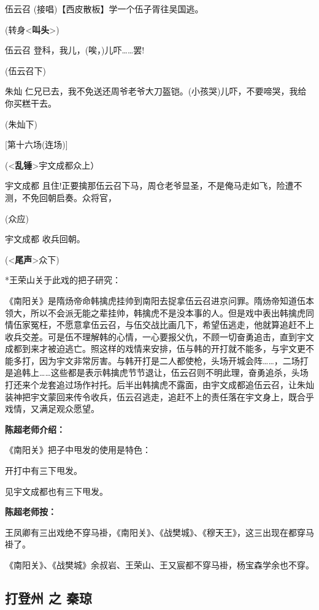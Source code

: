 伍云召 (接唱)【西皮散板】学一个伍子胥往吴国逃。

(转身\textless{}\textbf{叫头}\textgreater{})

伍云召 登科，我儿，(唉，)儿吓\ldots{}\ldots{}罢!

(伍云召下)

朱灿
仁兄已去，我不免送还周爷老爷大刀盔铠。(小孩哭)儿吓，不要啼哭，我给你买糕干去。

(朱灿下)

{[}第十六场(连场){]}

(\textless{}\textbf{乱锤}\textgreater{}宇文成都众上）

宇文成都
且住!正要擒那伍云召下马，周仓老爷显圣，不是俺马走如飞，险遭不测，不免回朝启奏。众将官，

(众应)

宇文成都 收兵回朝。

(\textless{}\textbf{尾声}\textgreater{}众下)

*王荣山关于此戏的把子研究：

《南阳关》是隋炀帝命韩擒虎挂帅到南阳去捉拿伍云召进京问罪。隋炀帝知道伍本领大，所以不会派无能之辈挂帅，韩擒虎不是没本事的人。但是戏中表出韩擒虎同情伍家冤枉，不愿意拿伍云召，与伍交战比画几下，希望伍逃走，他就算追赶不上收兵交差。可是伍不理解韩的心情，一心要报父仇，不顾一切奋勇追击，直到宇文成都到来才被迫逃亡。照这样的戏情来安排，伍与韩的开打就不能多，与宇文更不能多打，因为宇文非常厉害。与韩开打是二人都使枪，头场开城会阵\ldots{}\ldots{}，二场打是追韩上\ldots{}\ldots{}这些都是表示韩擒虎节节退让，伍云召则不明此理，奋勇追杀，头场打还来个龙套追过场作衬托。后半出韩擒虎不露面，由宇文成都追伍云召，让朱灿装神把宇文蒙回来传令收兵，伍云召逃走，追赶不上的责任落在宇文身上，既合乎戏情，又满足观众愿望。

\textbf{陈超老师介绍：}

《南阳关》把子中甩发的使用是特色：

开打中有三下甩发。

见宇文成都也有三下甩发。

\textbf{陈超老师按：}

王凤卿有三出戏绝不穿马褂，《南阳关》、《战樊城》、《穆天王》，这三出现在都穿马褂了。

《南阳关》、《战樊城》余叔岩、王荣山、王又宸都不穿马褂，杨宝森学余也不穿。

\newpage
\hypertarget{ux6253ux767bux5dde-ux4e4b-ux79e6ux743c}{%
\subsection{打登州 之
秦琼}\label{ux6253ux767bux5dde-ux4e4b-ux79e6ux743c}}

